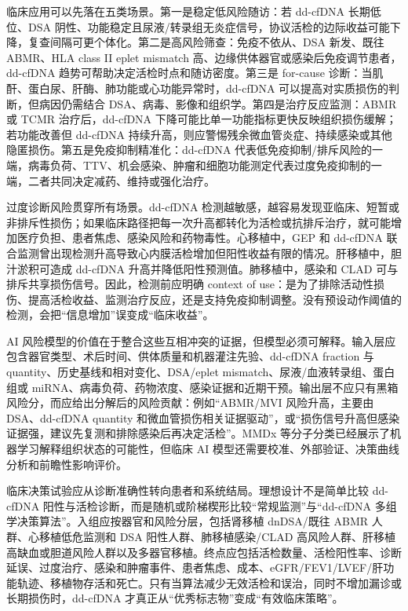 \documentclass[11pt,a4paper]{article}
\begin{document}
临床应用可以先落在五类场景。第一是稳定低风险随访：若 dd-cfDNA
长期低位、DSA 阴性、功能稳定且尿液/转录组无炎症信号，协议活检的边际收益可能下降，复查间隔可更个体化。第二是高风险筛查：免疫不依从、DSA
新发、既往 ABMR、HLA class II eplet mismatch
高、边缘供体器官或感染后免疫调节患者，dd-cfDNA
趋势可帮助决定活检时点和随访密度\cite{donorderivedcell20232, elevationofdonor2024}。第三是
for-cause 诊断：当肌酐、蛋白尿、肝酶、肺功能或心功能异常时，dd-cfDNA
可以提高对实质损伤的判断，但病因仍需结合 DSA、病毒、影像和组织学。第四是治疗反应监测：ABMR
或 TCMR 治疗后，dd-cfDNA
下降可能比单一功能指标更快反映组织损伤缓解；若功能改善但 dd-cfDNA
持续升高，则应警惕残余微血管炎症、持续感染或其他隐匿损伤\cite{associationofblood2025, donorderivedcell20244}。第五是免疫抑制精准化：dd-cfDNA
代表低免疫抑制/排斥风险的一端，病毒负荷、TTV、机会感染、肿瘤和细胞功能测定代表过度免疫抑制的一端，二者共同决定减药、维持或强化治疗。

过度诊断风险贯穿所有场景。dd-cfDNA
检测越敏感，越容易发现亚临床、短暂或非排斥性损伤；如果临床路径把每一次升高都转化为活检或抗排斥治疗，就可能增加医疗负担、患者焦虑、感染风险和药物毒性。心移植中，GEP
和 dd-cfDNA 联合监测曾出现检测升高导致心内膜活检增加但阳性收益有限的情况\cite{initiationofnoninvasive2021}。肝移植中，胆汁淤积可造成
dd-cfDNA 升高并降低阳性预测值\cite{donorderivedcell20252}。肺移植中，感染和 CLAD
可与排斥共享损伤信号\cite{clinicalvalidationof2022}。因此，检测前应明确 context
of use：是为了排除活动性损伤、提高活检收益、监测治疗反应，还是支持免疫抑制调整。没有预设动作阈值的检测，会把``信息增加''误变成``临床收益''。

AI 风险模型的价值在于整合这些互相冲突的证据，但模型必须可解释。输入层应包含器官类型、术后时间、供体质量和机器灌注先验、dd-cfDNA
fraction 与 quantity、历史基线和相对变化、DSA/eplet mismatch、尿液/血液转录组、蛋白组或 miRNA、病毒负荷、药物浓度、感染证据和近期干预。输出层不应只有黑箱风险分，而应给出分解后的风险贡献：例如``ABMR/MVI
风险升高，主要由 DSA、dd-cfDNA quantity 和微血管损伤相关证据驱动''，或``损伤信号升高但感染证据强，建议先复测和排除感染后再决定活检''。MMDx
等分子分类已经展示了机器学习解释组织状态的可能性，但临床 AI
模型还需要校准、外部验证、决策曲线分析和前瞻性影响评价\cite{themolecularphenotype2023, improvingdiagnosticperformance2025}。

临床决策试验应从诊断准确性转向患者和系统结局。理想设计不是简单比较 dd-cfDNA
阳性与活检诊断，而是随机或阶梯楔形比较``常规监测''与``dd-cfDNA
多组学决策算法''。入组应按器官和风险分层，包括肾移植 dnDSA/既往 ABMR
人群、心移植低危监测和 DSA 阳性人群、肺移植感染/CLAD
高风险人群、肝移植高缺血或胆道风险人群以及多器官移植。终点应包括活检数量、活检阳性率、诊断延误、过度治疗、感染和肿瘤事件、患者焦虑、成本、eGFR/FEV1/LVEF/肝功能轨迹、移植物存活和死亡。只有当算法减少无效活检和误治，同时不增加漏诊或长期损伤时，dd-cfDNA
才真正从``优秀标志物''变成``有效临床策略''。
\end{document}
